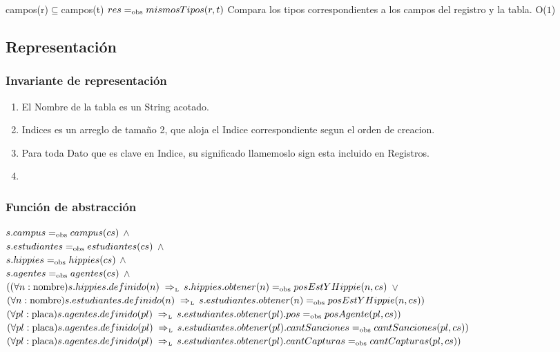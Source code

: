 {campos(r)$\subseteq$campos(t)}%
 {$res =_{\mathrm{obs}} mismosTipos(r,t)$}
 {Compara los tipos correspondientes a los campos del registro y la tabla.}
 {O($1$)}%
 {} 
 
\subsection{Representación}


\subsubsection*{Invariante de representación}

\begin{enumerate}
  \item El Nombre de la tabla es un String acotado.
  \item Indices es un arreglo de tamaño 2, que aloja el Indice correspondiente segun el orden de creacion.
  \item Para toda Dato que es clave en Indice, su significado llamemoslo sign esta incluido en Registros.
  \item 

\end{enumerate}


\subsubsection*{Función de abstracción}
$s.campus =_{\mathrm{obs}} campus(cs)$ $\land$ \\
$s.estudiantes =_{\mathrm{obs}} estudiantes(cs)$ $\land$ \\
$s.hippies =_{\mathrm{obs}} hippies(cs)$ $\land$ \\
$s.agentes =_{\mathrm{obs}} agentes(cs)$ $\land$ \\
$((\paratodo{nombre}{n}) s.hippies.definido(n) \impluego s.hippies.obtener(n) \igobs posEstYHippie(n,cs)$ $\lor$ \\
$(\paratodo{nombre}{n}) s.estudiantes.definido(n) \impluego s.estudiantes.obtener(n) \igobs posEstYHippie(n,cs))$ \\
$(\paratodo{placa}{pl}) s.agentes.definido(pl) \impluego s.estudiantes.obtener(pl).pos \igobs posAgente(pl,cs))$ \\
$(\paratodo{placa}{pl}) s.agentes.definido(pl) \impluego s.estudiantes.obtener(pl).cantSanciones \igobs cantSanciones(pl,cs))$ \\
$(\paratodo{placa}{pl}) s.agentes.definido(pl) \impluego s.estudiantes.obtener(pl).cantCapturas \igobs cantCapturas(pl,cs))$ \\

